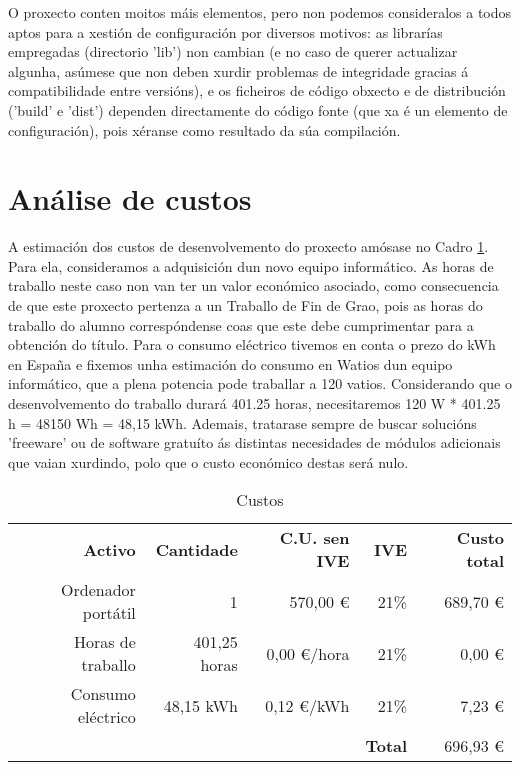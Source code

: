 O proxecto conten moitos máis elementos, pero non podemos consideralos a todos aptos para a xestión de configuración por diversos motivos: as librarías empregadas (directorio 'lib') non cambian (e no caso de querer actualizar algunha, asúmese que non deben xurdir problemas de integridade gracias á compatibilidade entre versións), e os ficheiros de código obxecto e de distribución ('build' e 'dist') dependen directamente do código fonte (que xa é un elemento de configuración), pois xéranse como resultado da súa compilación.

\section{Análise de custos}

A estimación dos custos de desenvolvemento do proxecto amósase no Cadro \ref{tab:custosLabel}. Para ela, consideramos a adquisición dun novo equipo informático. As horas de traballo neste caso non van ter un valor económico asociado, como consecuencia de que este proxecto pertenza a un Traballo de Fin de Grao, pois as horas do traballo do alumno correspóndense coas que este debe cumprimentar para a obtención do título. Para o consumo eléctrico tivemos en conta o prezo do kWh en España\cite{preciokWh_espana} e fixemos unha estimación\cite{energyusecalculator} do consumo en Watios dun equipo informático, que a plena potencia pode traballar a 120 vatios. Considerando que o desenvolvemento  do traballo durará 401.25 horas, necesitaremos 120 W * 401.25 h = 48150 Wh = 48,15 kWh. Ademais, tratarase sempre de buscar solucións 'freeware' ou de software gratuíto ás distintas necesidades de módulos adicionais que vaian xurdindo, polo que o custo económico destas será nulo.

\begin{table}[htbp]
  \centering
    \begin{tabular}{rrrrr}
    \textbf{Activo} & \textbf{Cantidade} & \textbf{C.U. sen IVE} & \textbf{IVE} & \textbf{Custo total} \\
    Ordenador portátil & 1     & 570,00 \euro & 21\%  & 689,70 \euro \\
    Horas de traballo & 401,25 horas & 0,00 \euro/hora & 21\%  & 0,00 \euro \\
    Consumo eléctrico & 48,15 kWh & 0,12 \euro/kWh & 21\%  & 7,23 \euro \\
          &       &       & \textbf{Total} & 696,93 \euro \\
    \end{tabular}%
		\caption{Custos}
  \label{tab:custosLabel}%
\end{table}%

